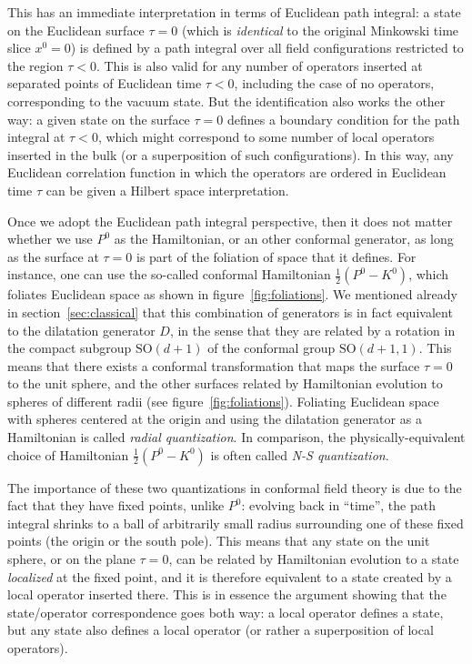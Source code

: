 \documentclass[a4paper,12pt]{article}
\newcommand{\SO}{\text{SO}}
\numberwithin{equation}{section}
\begin{document}
This has an immediate interpretation in terms of Euclidean path integral: 
a state on the Euclidean surface $\tau = 0$ (which is \emph{identical} to the original Minkowski time slice $x^0 = 0$) is defined by a path integral over all field configurations restricted to the region $\tau < 0$. This is also valid for any number of operators inserted at separated points of Euclidean time $\tau < 0$, including the case of no operators, corresponding to the vacuum state. But the identification also works the other way: a given state on the surface $\tau = 0$ defines a boundary condition for the path integral at $\tau < 0$, which might correspond to some number of local operators inserted in the bulk (or a superposition of such configurations).
In this way, any Euclidean correlation function in which the operators are ordered in Euclidean time $\tau$ can be given a Hilbert space interpretation.

Once we adopt the Euclidean path integral perspective, then it does not matter whether we use $P^0$ as the Hamiltonian, or an other conformal generator, as long as the surface at $\tau = 0$ is part of the foliation of space that it defines. For instance, one can use the so-called conformal Hamiltonian $\frac{1}{2} (P^0 - K^0)$, which foliates Euclidean space as shown in figure~\ref{fig:foliations}.
We mentioned already in section~\ref{sec:classical} that this combination of generators is in fact equivalent to the dilatation generator $D$, in the sense that they are related by a rotation in the compact subgroup $\SO(d + 1)$ of the conformal group $\SO(d+1, 1)$.
This means that there exists a conformal transformation that maps the surface $\tau = 0$ to the unit sphere, and the other surfaces related by Hamiltonian evolution to spheres of different radii (see figure~\ref{fig:foliations}).
Foliating Euclidean space with spheres centered at the origin and using the dilatation generator as a Hamiltonian is called \emph{radial quantization}. In comparison, the physically-equivalent choice of Hamiltonian  $\frac{1}{2} (P^0 - K^0)$ is often called \emph{N-S quantization}.

The importance of these two quantizations in conformal field theory is due to the fact that they have fixed points, unlike $P^0$: evolving back in ``time'', the path integral shrinks to a ball of arbitrarily small radius surrounding one of these fixed points (the origin or the south pole). This means that any state on the unit sphere, or on the plane $\tau = 0$, can be related by Hamiltonian evolution to a state \emph{localized} at the fixed point, and it is therefore equivalent to a state created by a local operator inserted there.
This is in essence the argument showing that the state/operator correspondence goes both way: a local operator defines a state, but any state also defines a local operator (or rather a superposition of local operators).
\end{document}
